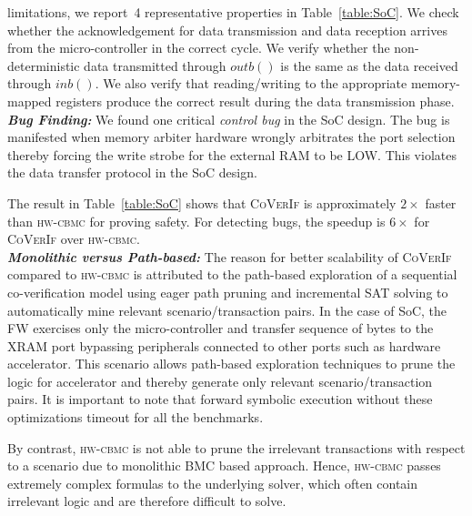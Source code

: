 \documentclass[sigconf]{acmart}
\newcommand{\tool}[1]{\textsc{#1}\xspace}
\newcommand{\hwcbmcv}{\tool{hw-cbmc}}
\newcommand{\verifox}{\tool{CoVerIf}}
\begin{document}
limitations, we report~4 representative properties in Table~\ref{table:SoC}.  
We check whether the acknowledgement for data transmission and data reception arrives
from the micro-controller in the correct cycle.  We verify whether the
non-deterministic data transmitted through $outb()$ is the same as 
the data received through $inb()$.  We also verify that
reading/writing to the appropriate memory-mapped registers produce the
correct result during the data transmission phase.\\ 
\textbf{\emph{Bug Finding:}} We found one critical \emph{control bug} 
in the SoC design.  The bug is manifested when memory arbiter hardware 
wrongly arbitrates the port selection thereby forcing the write strobe 
for the external RAM to be LOW.  This violates the data transfer protocol 
in the SoC design.

The result in Table~\ref{table:SoC} shows that \verifox is approximately
$2\times$ faster than \hwcbmcv for proving safety.  For detecting bugs, 
the speedup is $6\times$ for \verifox over \hwcbmcv. \\ 
\textbf{\emph{Monolithic versus Path-based:}}
The reason for better scalability of \verifox compared to 
\hwcbmcv is attributed to the path-based exploration of a 
sequential co-verification model using eager path pruning and 
incremental SAT solving to automatically mine relevant scenario/transaction
pairs.  In the case of SoC, the FW exercises only the micro-controller 
and transfer sequence of bytes to the XRAM port bypassing peripherals 
connected to other ports such as hardware accelerator.  
This scenario allows path-based exploration techniques to prune the logic for
accelerator and thereby generate only relevant scenario/transaction pairs.  It 
is important to note that forward symbolic execution without these optimizations 
timeout for all the benchmarks.

By contrast, \hwcbmcv is not able to prune the irrelevant transactions with
respect to a scenario due to monolithic BMC based approach.  Hence, \hwcbmcv
passes extremely complex formulas to the underlying solver, which often
contain irrelevant logic and are therefore difficult to solve.

\end{document}
